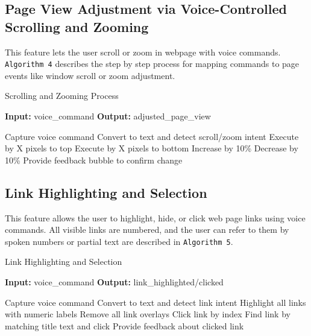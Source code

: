 \subsection{Page View Adjustment via Voice-Controlled Scrolling and Zooming}

This feature lets the user scroll or zoom in webpage with voice commands. \texttt{Algorithm 4} describes the step by step process for mapping commands to page events like window scroll or zoom adjustment.

\begin{algorithm}[H]
    \caption{Scrolling and Zooming Process}
    \label{alg:scroll_zoom}
    \textbf{Input:} voice\_command  
    \textbf{Output:} adjusted_page_view  
    \begin{algorithmic}[1]
        \State Capture voice command
        \State Convert to text and detect scroll/zoom intent
            \State Execute  by X pixels to top
            \State Execute  by X pixels to bottom
            \State Increase  by 10\% 
            \State Decrease  by 10\% 
        \EndIf
        \State Provide feedback bubble to confirm change
    \end{algorithmic}
\end{algorithm}

\subsection{Link Highlighting and Selection}

This feature allows the user to highlight, hide, or click web page links using voice commands. All visible links are numbered, and the user can refer to them by spoken numbers or partial text are described in \texttt{Algorithm 5}.

\begin{algorithm}[H]
    \caption{Link Highlighting and Selection}
    \label{alg:link_interaction}
    \textbf{Input:} voice\_command  
    \textbf{Output:} link\_highlighted/clicked  
    \begin{algorithmic}[1]
        \State Capture voice command
        \State Convert to text and detect link intent
            \State Highlight all links with numeric labels
            \State Remove all link overlays
                \State Click link by index 
            \Else 
                \State Find link by matching title text and click 
            \EndIf
        \EndIf
        \State Provide feedback about clicked link
    \end{algorithmic}
\end{algorithm}

